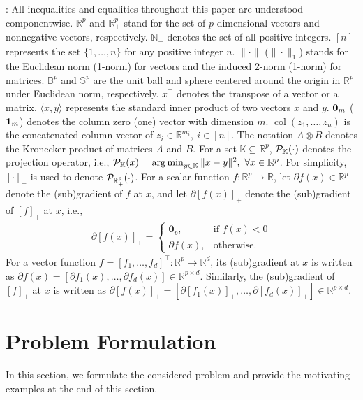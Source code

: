 \documentclass[12pt,draftcls,onecolumn]{IEEEtran}%
\DeclareMathOperator*{\argmin}{arg\,min}
\DeclareMathOperator{\col}{col}
\begin{document}
: All inequalities and equalities throughout this paper are understood componentwise. $\mathbb{R}^p$ and $\mathbb{R}^p_+$ stand for the set of $p$-dimensional vectors and nonnegative vectors, respectively. $\mathbb{N}_+$ denotes the set of all positive integers. $[n]$ represents the set $\{1,\dots,n\}$ for any positive integer $n$. $\|\cdot\|$ ($\|\cdot\|_1$) stands for the Euclidean norm (1-norm) for vectors and the induced 2-norm (1-norm) for matrices. $\mathbb{B}^p$ and $\mathbb{S}^p$ are the unit ball and sphere centered around the origin in $\mathbb{R}^p$ under Euclidean norm, respectively. 
$x^\top$ denotes the transpose of a vector or a matrix. $\langle x,y\rangle$ represents the standard inner product of two vectors $x$ and $y$. ${\bf 0}_m$ (${\bf 1}_m$) denotes the column zero (one) vector with dimension $m$. $\col(z_1,\dots,z_n)$ is the concatenated column vector of $z_i\in\mathbb{R}^{m_i},~i\in[n]$. The notation $A\otimes B$ denotes the Kronecker product
of matrices $A$ and $B$. For a set $\mathbb{K}\subseteq\mathbb{R}^p$, ${\mathcal{P}}_{\mathbb{K}}(\cdot)$ denotes the projection operator, i.e.,  $\calP_{\mathbb{K}}(x)=\argmin_{y\in\mathbb{K}}\|x-y\|^2,~\forall x\in\Real^{p}$. For simplicity, $[\cdot]_+$ is used to denote ${\mathcal{P}}_{\mathbb{R}^p_+}(\cdot)$. For a scalar function $f:\mathbb{R}^p\rightarrow\mathbb{R}$, let $\partial f(x)\in\mathbb{R}^p$ denote the (sub)gradient of $f$ at $x$, and let $\partial [f(x)]_+$ denote the (sub)gradient of $[f]_+$ at $x$, i.e.,
\begin{align*}
	\partial [f(x)]_+=
	\begin{cases}
		\bm{0}_p, & \mbox{if } f(x)<0 \\
		\partial f(x), & \mbox{otherwise}.
	\end{cases}
\end{align*}
For a vector function $f=[f_1,\dots,f_d]^\top:\mathbb{R}^{p}\rightarrow\mathbb{R}^d$, its (sub)gradient at $x$ is written as $\partial f(x)=[\partial f_1(x),\dots,\partial f_d(x)]\in\mathbb{R}^{p\times d}$. Similarly, the (sub)gradient of $[f]_+$ at $x$ is written as $\partial [f(x)]_+=[\partial [f_1(x)]_+,\dots,\partial [f_d(x)]_+]\in\mathbb{R}^{p\times d}$.


\section{Problem Formulation}\label{online_opsec:problem}
In this section, we formulate the considered problem and provide the motivating examples at the end of this section.
\end{document}
